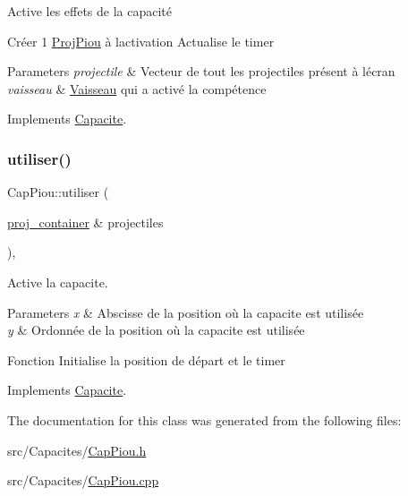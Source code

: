 Active les effets de la capacité 

Créer 1 \mbox{\hyperlink{class_proj_piou}{Proj\+Piou}} à l\textquotesingle{}activation Actualise le timer 
\begin{DoxyParams}{Parameters}
{\em projectile} & Vecteur de tout les projectiles présent à l\textquotesingle{}écran \\
\hline
{\em vaisseau} & \mbox{\hyperlink{class_vaisseau}{Vaisseau}} qui a activé la compétence \\
\hline
\end{DoxyParams}


Implements \mbox{\hyperlink{class_capacite_a85355aeb1d4acc049ed97da177acbd5f}{Capacite}}.

\mbox{\label{class_cap_piou_a8833dd4c07fac882bcbad2698fdcd8c4}} 
\subsubsection{\texorpdfstring{utiliser()}{utiliser()}}
{\footnotesize\ttfamily Cap\+Piou\+::utiliser (\begin{DoxyParamCaption}\item[{\mbox{\hyperlink{def__type_8h_a87980cd8ee9533e561a73e8bbc728188}{proj\+\_\+container}} \&}]{projectiles }\end{DoxyParamCaption})\hspace{0.3cm}{\ttfamily [override]}, {\ttfamily [virtual]}}



Active la capacite. 


\begin{DoxyParams}{Parameters}
{\em x} & Abscisse de la position où la capacite est utilisée \\
\hline
{\em y} & Ordonnée de la position où la capacite est utilisée\\
\hline
\end{DoxyParams}
Fonction Initialise la position de départ et le timer 

Implements \mbox{\hyperlink{class_capacite_abac1434e2ac3ecc9e5afdafd9a7a4bed}{Capacite}}.



The documentation for this class was generated from the following files\+:\begin{DoxyCompactItemize}
\item 
src/\+Capacites/\mbox{\hyperlink{_cap_piou_8h}{Cap\+Piou.\+h}}\item 
src/\+Capacites/\mbox{\hyperlink{_cap_piou_8cpp}{Cap\+Piou.\+cpp}}\end{DoxyCompactItemize}
